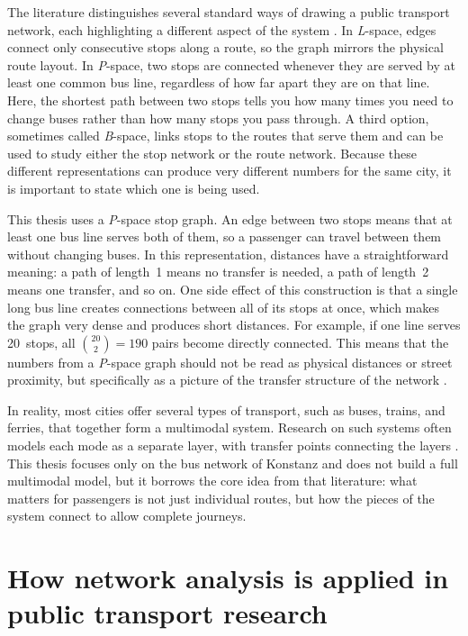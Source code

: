 \documentclass[12pt,a4paper,oneside]{report}
\newcommand{\pspace}{\textit{P}-space}
\begin{document}
The literature distinguishes several standard ways of drawing a public transport network, each highlighting a different aspect of the system \citep{shanmukhappa2019}.
In \textit{L}-space, edges connect only consecutive stops along a route, so the graph mirrors the physical route layout.
In \pspace{}, two stops are connected whenever they are served by at least one common bus line, regardless of how far apart they are on that line.
Here, the shortest path between two stops tells you how many times you need to change buses rather than how many stops you pass through.
A third option, sometimes called \textit{B}-space, links stops to the routes that serve them and can be used to study either the stop network or the route network.
Because these different representations can produce very different numbers for the same city, it is important to state which one is being used.

This thesis uses a \pspace{} stop graph.
An edge between two stops means that at least one bus line serves both of them, so a passenger can travel between them without changing buses.
In this representation, distances have a straightforward meaning: a path of length~1 means no transfer is needed, a path of length~2 means one transfer, and so on.
One side effect of this construction is that a single long bus line creates connections between all of its stops at once, which makes the graph very dense and produces short distances.
For example, if one line serves 20~stops, all $\binom{20}{2} = 190$ pairs become directly connected.
This means that the numbers from a \pspace{} graph should not be read as physical distances or street proximity, but specifically as a picture of the transfer structure of the network \citep{shanmukhappa2019,zhang2025}.

In reality, most cities offer several types of transport, such as buses, trains, and ferries, that together form a multimodal system.
Research on such systems often models each mode as a separate layer, with transfer points connecting the layers \citep{alessandretti2022,artime2022}.
This thesis focuses only on the bus network of Konstanz and does not build a full multimodal model, but it borrows the core idea from that literature: what matters for passengers is not just individual routes, but how the pieces of the system connect to allow complete journeys.

\section{How network analysis is applied in public transport research}\label{sec:applications}
\end{document}
